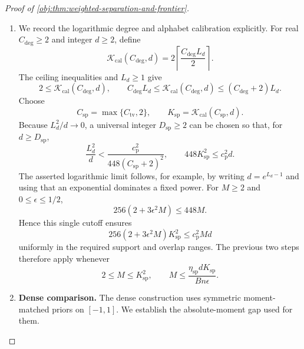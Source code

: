 \documentclass[11pt]{article}
\begin{document}
\begin{proof}[Proof of \cref{obj:thm:weighted-separation-and-frontier}]
\begin{enumerate}
\item
We record the logarithmic degree and alphabet calibration explicitly. For real \(C_{\mathrm{deg}}\ge2\) and integer \(d\ge2\), define
\[
\mathcal K_{\mathrm{cal}}(C_{\mathrm{deg}},d)
=2\left\lceil\frac{C_{\mathrm{deg}}L_d}{2}\right\rceil.
\]
The ceiling inequalities and \(L_d\ge1\) give
\[
2\le\mathcal K_{\mathrm{cal}}(C_{\mathrm{deg}},d),
\qquad
C_{\mathrm{deg}}L_d
\le\mathcal K_{\mathrm{cal}}(C_{\mathrm{deg}},d)
\le(C_{\mathrm{deg}}+2)L_d.
\]
Choose
\[
C_{\mathrm{sp}}=\max\{C_{\mathrm{tv}},2\},
\qquad
K_{\mathrm{sp}}=\mathcal K_{\mathrm{cal}}(C_{\mathrm{sp}},d).
\]
Because \(L_d^2/d\to0\), a universal integer \(D_{\mathrm{sp}}\ge2\) can be chosen so that, for \(d\ge D_{\mathrm{sp}}\),
\[
\frac{L_d^2}{d}
<
\frac{c_{\mathrm p}^2}{448(C_{\mathrm{sp}}+2)^2},
\qquad
448K_{\mathrm{sp}}^2\le c_{\mathrm p}^2d.
\]
The asserted logarithmic limit follows, for example, by writing
\(d=e^{L_d-1}\) and using that an exponential dominates a fixed power. For \(M\ge2\) and \(0\le\epsilon\le1/2\),
\[
256(2+3\epsilon^2M)\le448M.
\]
Hence this single cutoff ensures
\[
256(2+3\epsilon^2M)K_{\mathrm{sp}}^2
\le c_{\mathrm p}^2Md
\]
uniformly in the required support and overlap ranges. The previous two steps therefore apply whenever
\[
2\le M\le K_{\mathrm{sp}}^2,
\qquad
M\le\frac{\eta_{\mathrm{sp}}dK_{\mathrm{sp}}}{Bn\epsilon}.
\]

\item
\textbf{Dense comparison.}\quad
The dense construction uses symmetric moment-matched priors on \([-1,1]\). We establish the absolute-moment gap used for them.


\end{enumerate}
\end{proof}
\end{document}
